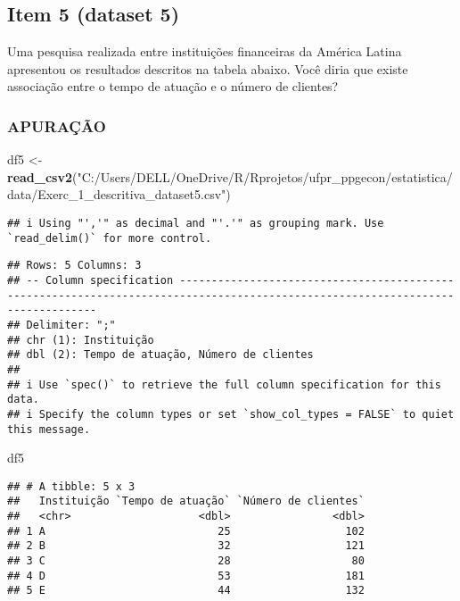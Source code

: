 \documentclass[
]{article}
\newenvironment{Shaded}{\begin{snugshade}}{\end{snugshade}}
\newcommand{\FunctionTok}[1]{\textcolor[rgb]{0.13,0.29,0.53}{\textbf{#1}}}
\newcommand{\NormalTok}[1]{#1}
\newcommand{\OtherTok}[1]{\textcolor[rgb]{0.56,0.35,0.01}{#1}}
\newcommand{\StringTok}[1]{\textcolor[rgb]{0.31,0.60,0.02}{#1}}
\begin{document}
\hypertarget{item-5-dataset-5}{%
\subsection{Item 5 (dataset 5)}\label{item-5-dataset-5}}

Uma pesquisa realizada entre instituições financeiras da América Latina
apresentou os resultados descritos na tabela abaixo. Você diria que
existe associação entre o tempo de atuação e o número de clientes?

\hypertarget{apurauxe7uxe3o-4}{%
\subsubsection{APURAÇÃO}\label{apurauxe7uxe3o-4}}

\begin{Shaded}
\begin{Highlighting}[]
\NormalTok{df5 }\OtherTok{\textless{}{-}} \FunctionTok{read\_csv2}\NormalTok{(}\StringTok{"C:/Users/DELL/OneDrive/R/Rprojetos/ufpr\_ppgecon/estatistica/data/Exerc\_1\_descritiva\_dataset5.csv"}\NormalTok{)}
\end{Highlighting}
\end{Shaded}

\begin{verbatim}
## i Using "','" as decimal and "'.'" as grouping mark. Use `read_delim()` for more control.
\end{verbatim}

\begin{verbatim}
## Rows: 5 Columns: 3
## -- Column specification -------------------------------------------------------------------------------------------------------------------------------
## Delimiter: ";"
## chr (1): Instituição
## dbl (2): Tempo de atuação, Número de clientes
## 
## i Use `spec()` to retrieve the full column specification for this data.
## i Specify the column types or set `show_col_types = FALSE` to quiet this message.
\end{verbatim}

\begin{Shaded}
\begin{Highlighting}[]
\NormalTok{df5}
\end{Highlighting}
\end{Shaded}

\begin{verbatim}
## # A tibble: 5 x 3
##   Instituição `Tempo de atuação` `Número de clientes`
##   <chr>                    <dbl>                <dbl>
## 1 A                           25                  102
## 2 B                           32                  121
## 3 C                           28                   80
## 4 D                           53                  181
## 5 E                           44                  132
\end{verbatim}
\end{document}
